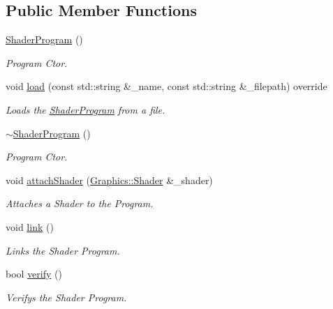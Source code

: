 \subsection*{Public Member Functions}
\begin{DoxyCompactItemize}
\item 
\hyperlink{class_cookie_eng_1_1_resources_1_1_shader_program_a2de1a879247aa4ee38fc2c37408c5285}{Shader\+Program} ()
\begin{DoxyCompactList}\small\item\em Program Ctor. \end{DoxyCompactList}\item 
void \hyperlink{class_cookie_eng_1_1_resources_1_1_shader_program_aef29916bad667d1f820053fd891d9e58}{load} (const std\+::string \&\+\_\+name, const std\+::string \&\+\_\+filepath) override
\begin{DoxyCompactList}\small\item\em Loads the \hyperlink{class_cookie_eng_1_1_resources_1_1_shader_program}{Shader\+Program} from a file. \end{DoxyCompactList}\item 
\hyperlink{class_cookie_eng_1_1_resources_1_1_shader_program_a453b80b995d1b352c73fbac672d4dbc5}{$\sim$\+Shader\+Program} ()
\begin{DoxyCompactList}\small\item\em Program Ctor. \end{DoxyCompactList}\item 
void \hyperlink{class_cookie_eng_1_1_resources_1_1_shader_program_a951108feded567e573928dbb1d8caeca}{attach\+Shader} (\hyperlink{class_cookie_eng_1_1_graphics_1_1_shader}{Graphics\+::\+Shader} \&\+\_\+shader)
\begin{DoxyCompactList}\small\item\em Attaches a Shader to the Program. \end{DoxyCompactList}\item 
void \hyperlink{class_cookie_eng_1_1_resources_1_1_shader_program_ac1c103a1f174c4053a94b65e4f32ccfc}{link} ()
\begin{DoxyCompactList}\small\item\em Links the Shader Program. \end{DoxyCompactList}\item 
bool \hyperlink{class_cookie_eng_1_1_resources_1_1_shader_program_aaf510d906b80d93a10e90fa0fea26bb2}{verify} ()
\begin{DoxyCompactList}\small\item\em Verifys the Shader Program. \end{DoxyCompactList}\item 

\end{DoxyCompactItemize}
